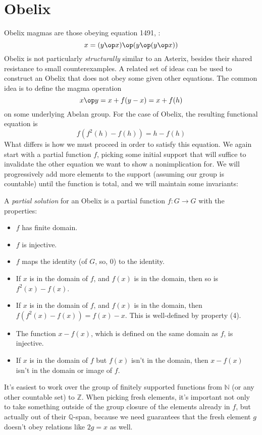 \section{Obelix}
Obelix magmas are those obeying equation 1491, :
$$x = (y \op x) \op (y \op (y \op x))$$
Obelix is not particularly {\em structurally} similar to an Asterix, besides their shared resistance
to small counterexamples. A related set of ideas can be used to construct an Obelix that does not
obey some given other equations. The common idea is to define the magma operation
$$ x \op y = x + f(y-x) = x + f(h)$$
on some underlying Abelan group. For the case of Obelix, the resulting functional equation is
\begin{equation}\label{fh2}
  f(f^{2}(h) - f(h)) = h - f(h)
\end{equation}
What differs is how we must proceed in order to satisfy this equation. We again start with a partial function $f$,
picking some initial support that will suffice to invalidate the other equation we want to show a nonimplication for.
We will progressively add more elements to the support (assuming our group is countable) until the function
is total, and we will maintain some invariants:
\begin{definition}\label{partial-solution2}  A \emph{partial solution} for an Obelix is a partial function $f : G \to G$
with the properties:
\begin{itemize}
  \item $f$ has finite domain.
  \item $f$ is injective.
  \item $f$ maps the identity (of $G$, so, 0) to the identity.
  \item If $x$ is in the domain of $f$, and $f(x)$ is in the domain, then so is $f^2(x) - f(x)$.
  \item If $x$ is in the domain of $f$, and $f(x)$ is in the domain, then $f(f^2(x) - f(x)) = f(x) - x$. This is well-defined by property (4).
  \item The function $x - f(x)$, which is defined on the same domain as $f$, is injective.
  \item If $x$ is in the domain of $f$ but $f(x)$ isn't in the domain, then $x - f(x)$ isn't in the domain or image of $f$.
\end{itemize}
\end{definition}
It's easiest to work over the group of finitely supported functions from $\mathbb{N}$ (or any other
countable set) to $\mathbb{Z}$. When picking fresh elements, it's important not only to take something
outside of the group closure of the elements already in $f$, but actually out of their $\mathbb{Q}$-span,
because we need guarantees that the fresh element $g$ doesn't obey relations like $2g = x$ as well.

